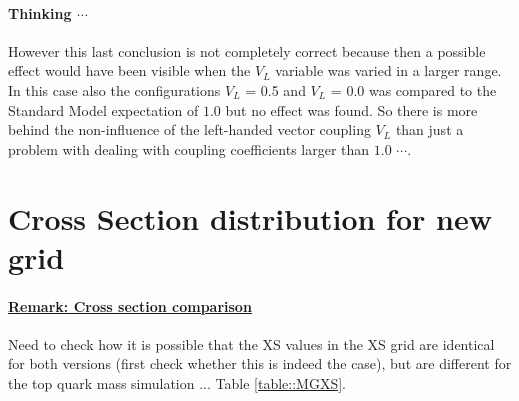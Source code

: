 \paragraph{Thinking $\cdots$ \\} 
However this last conclusion is not completely correct because then a possible effect would have been visible when the $V_L$ variable was varied in a larger range. In this case also the configurations $V_L$ = 0.5 and $V_L$ = 0.0 was compared to the Standard Model expectation of $1.0$ but no effect was found. So there is more behind the non-influence of the left-handed vector coupling $V_L$ than just a problem with dealing with coupling coefficients larger than $1.0$ $\cdots$.


\section{Cross Section distribution for new grid}
\paragraph{\underline{Remark: Cross section comparison}\\}
Need to check how it is possible that the XS values in the XS grid are identical for both versions (first check whether this is indeed the case), but are different for the top quark mass simulation ... Table \ref{table::MGXS}.
